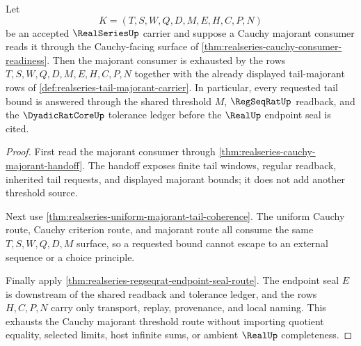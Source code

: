 \begin{theorem}
\label{thm:realseries-cauchy-majorant-threshold-exhaustion}
Let
$$
K=(T,S,W,Q,D,M,E,H,C,P,N)
$$
be an accepted $\RealSeriesUp$ carrier and suppose a Cauchy majorant consumer reads it through the Cauchy-facing surface of \autoref{thm:realseries-cauchy-consumer-readiness}. Then the majorant consumer is exhausted by the rows $T,S,W,Q,D,M,E,H,C,P,N$ together with the already displayed tail-majorant rows of \autoref{def:realseries-tail-majorant-carrier}. In particular, every requested tail bound is answered through the shared threshold $M$, $\RegSeqRatUp$ readback, and the $\DyadicRatCoreUp$ tolerance ledger before the $\RealUp$ endpoint seal is cited.
\end{theorem}
\begin{proof}
First read the majorant consumer through \autoref{thm:realseries-cauchy-majorant-handoff}. The handoff exposes finite tail windows, regular readback, inherited tail requests, and displayed majorant bounds; it does not add another threshold source.

Next use \autoref{thm:realseries-uniform-majorant-tail-coherence}. The uniform Cauchy route, Cauchy criterion route, and majorant route all consume the same $T,S,W,Q,D,M$ surface, so a requested bound cannot escape to an external sequence or a choice principle.

Finally apply \autoref{thm:realseries-regseqrat-endpoint-seal-route}. The endpoint seal $E$ is downstream of the shared readback and tolerance ledger, and the rows $H,C,P,N$ carry only transport, replay, provenance, and local naming. This exhausts the Cauchy majorant threshold route without importing quotient equality, selected limits, host infinite sums, or ambient $\RealUp$ completeness.
\end{proof}


